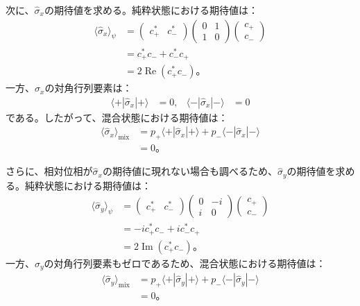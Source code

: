 \documentclass[platex,dvipdfmx,a4paper]{jsarticle}
\begin{document}
次に、$\hat{\sigma}_x$の期待値を求める。純粋状態における期待値は：
\begin{align*}
  \langle\hat{\sigma}_x\rangle_\psi
  &=
  \begin{pmatrix}
    c_+^* & c_-^*
  \end{pmatrix}
  \begin{pmatrix}
    0 & 1 \\
    1 & 0
  \end{pmatrix}
  \begin{pmatrix}
    c_+ \\
    c_-
  \end{pmatrix} \\
  &=c_+^*c_-+c_-^*c_+ \\
  &=2\operatorname{Re}\left(c_+^*c_-\right)。
\end{align*}
一方、$\hat{\sigma}_x$の対角行列要素は：
\begin{align*}
  \langle+|\hat{\sigma}_x|+\rangle
  &=0,
  &
  \langle-|\hat{\sigma}_x|-\rangle
  &=0
\end{align*}
である。したがって、混合状態における期待値は：
\begin{align*}
  \langle\hat{\sigma}_x\rangle_{\mathrm{mix}}
  &=p_+\langle+|\hat{\sigma}_x|+\rangle
    +p_-\langle-|\hat{\sigma}_x|-\rangle \\
  &=0。
\end{align*}

さらに、相対位相が$\hat{\sigma}_x$の期待値に現れない場合も調べるため、$\hat{\sigma}_y$の期待値を求める。純粋状態における期待値は：
\begin{align*}
  \langle\hat{\sigma}_y\rangle_\psi
  &=
  \begin{pmatrix}
    c_+^* & c_-^*
  \end{pmatrix}
  \begin{pmatrix}
    0 & -i \\
    i & 0
  \end{pmatrix}
  \begin{pmatrix}
    c_+ \\
    c_-
  \end{pmatrix} \\
  &=-ic_+^*c_-+ic_-^*c_+ \\
  &=2\operatorname{Im}\left(c_+^*c_-\right)。
\end{align*}
一方、$\hat{\sigma}_y$の対角行列要素もゼロであるため、混合状態における期待値は：
\begin{align*}
  \langle\hat{\sigma}_y\rangle_{\mathrm{mix}}
  &=p_+\langle+|\hat{\sigma}_y|+\rangle
    +p_-\langle-|\hat{\sigma}_y|-\rangle \\
  &=0。
\end{align*}
\end{document}
